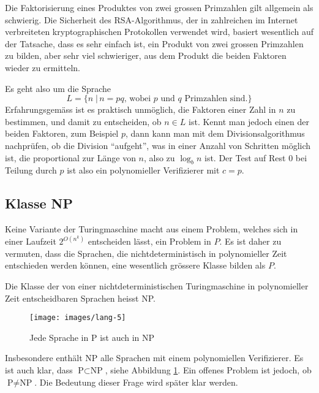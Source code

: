 \begin{beispiel}[Faktorisierung]
Die Faktorisierung eines Produktes von zwei grossen Primzahlen
gilt allgemein als schwierig.
Die Sicherheit des RSA-Algorithmus,
der in zahlreichen im Internet verbreiteten kryptographischen
Protokollen verwendet wird, basiert wesentlich auf der Tatsache, dass
es sehr einfach ist, ein Produkt von zwei grossen Primzahlen zu
bilden, aber sehr viel schwieriger, aus dem Produkt die beiden
Faktoren wieder zu ermitteln.

Es geht also um die Sprache
\[
L
=
\{
n\;|\,\text{$n=pq$, wobei $p$ und $q$ Primzahlen sind}.
\}
\]
Erfahrungsgemäss ist es praktisch unmöglich, die Faktoren
einer Zahl in $n$ zu bestimmen, und damit zu entscheiden, ob
$n\in L$ ist.
Kennt man jedoch einen der beiden Faktoren,
zum Beispiel $p$, dann kann man mit dem Divisionsalgorithmus
nachprüfen, ob die Division ``aufgeht'', was in einer Anzahl
von Schritten möglich ist, die proportional zur Länge von 
$n$, also zu $\log_b n$ ist.
Der Test auf Rest 0 bei Teilung
durch $p$ ist also ein polynomieller Verifizierer mit $c=p$.
\end{beispiel}

\subsection{Klasse NP}
Keine Variante der Turingmaschine macht aus einem Problem,
welches sich in einer Laufzeit $2^{O(n^k)}$ entscheiden
lässt, ein Problem in $P$.
Es ist daher zu vermuten,
dass die Sprachen, die nichtdeterministisch in polynomieller
Zeit entschieden werden können, eine wesentlich grössere
Klasse bilden als $P$.

\begin{definition}
%
Die Klasse der von einer nichtdeterministischen Turingmaschine
in polynomieller Zeit entscheidbaren Sprachen heisst NP.
\end{definition}

\begin{figure}
\begin{center}
\texttt{[image: images/lang-5]}
\end{center}
\caption{Jede Sprache in P ist auch in NP\label{psubsetnp}}
\end{figure}%

Insbesondere enthält NP alle Sprachen mit einem polynomiellen
Verifizierer.
Es ist auch klar, dass $\text{P}\subset\text{NP}$,
siehe Abbildung \ref{psubsetnp}.
Ein offenes Problem ist jedoch, ob $\text{P}\ne \text{NP}$.
Die Bedeutung dieser Frage wird später klar werden.

